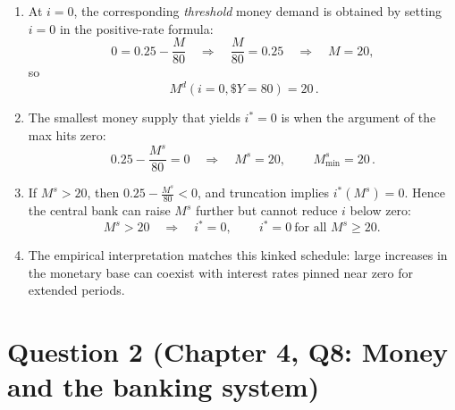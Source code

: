 \documentclass[12pt]{article}
\begin{document}
\begin{enumerate}[label=(\alph*)]
\item At \(i=0\), the corresponding \emph{threshold} money demand is obtained by setting \(i=0\) in the positive-rate formula:
\[
0 = 0.25-\frac{M}{80}
\quad\Longrightarrow\quad
\frac{M}{80}=0.25
\quad\Longrightarrow\quad
M=20,
\]
so
\[
\boxed{\,M^d(i=0,\$Y=80)=20\,}.
\]

\item The smallest money supply that yields \(i^*=0\) is when the argument of the max hits zero:
\[
0.25-\frac{M^s}{80}=0
\quad\Longrightarrow\quad
M^s=20,
\qquad
\boxed{\,M^s_{\min}=20\,}.
\]

\item If \(M^s>20\), then \(0.25-\frac{M^s}{80}<0\), and truncation implies \(i^*(M^s)=0\). Hence the central bank can raise \(M^s\) further but cannot reduce \(i\) below zero:
\[
M^s>20 \quad\Longrightarrow\quad i^*=0,
\qquad
\boxed{\,i^*=0\ \text{for all }M^s\ge 20.\,}
\]

\item The empirical interpretation matches this kinked schedule: large increases in the monetary base can coexist with interest rates pinned near zero for extended periods.
\end{enumerate}

\newpage

\section*{Question 2 (Chapter 4, Q8: Money and the banking system)}
\end{document}
